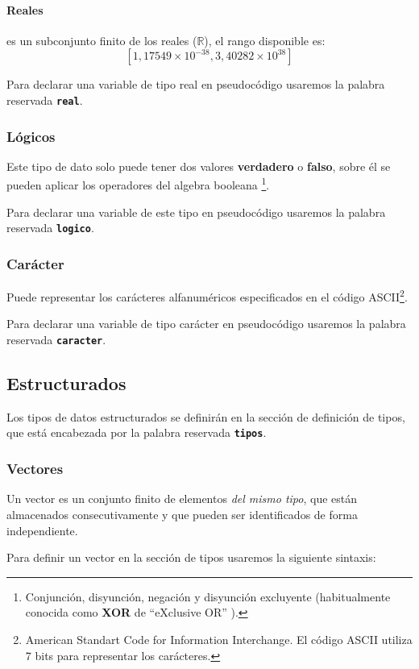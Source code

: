 \documentclass{article}
\newcommand{\pkeyword}[1]{\textcolor{azulpseudo}{\texttt{\textbf{#1}}}}
\begin{document}
\paragraph{Reales} es un subconjunto finito de los reales ($\mathbb{R}$), el rango disponible es: $$\left[ 1,17549\times 10^{-38}, 3,40282\times 10^{38} \right]$$


Para declarar una variable de tipo real en pseudocódigo usaremos la palabra reservada \pkeyword{real}.

\subsubsection{Lógicos}
Este tipo de dato solo puede tener dos valores \textbf{verdadero} o \textbf{falso}, sobre él se pueden aplicar los operadores del algebra booleana
\footnote{Conjunción, disyunción, negación y disyunción excluyente (habitualmente conocida como \textbf{XOR} de ``eXclusive OR'' ).}.

Para declarar una variable de este tipo en pseudocódigo usaremos la palabra reservada \pkeyword{logico}.

\subsubsection{Carácter}

Puede representar los carácteres alfanuméricos especificados en el código ASCII\footnote{American Standart Code for Information Interchange.
  El código ASCII utiliza 7 bits para representar los carácteres.}.

Para declarar una variable de tipo carácter en pseudocódigo usaremos la palabra reservada \pkeyword{caracter}.

\subsection{Estructurados}
Los tipos de datos estructurados se definirán en la sección de definición de tipos, que está encabezada por la palabra reservada \pkeyword{tipos}.
\subsubsection{Vectores}
Un vector es un conjunto finito de elementos \textit{del mismo tipo}, que están almacenados consecutivamente y que pueden ser identificados de forma independiente.

Para definir un vector en la sección de tipos usaremos la siguiente sintaxis:
\end{document}
